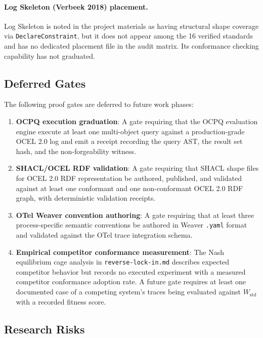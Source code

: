 \paragraph{Log Skeleton (Verbeek 2018) placement.}
Log Skeleton is noted in the project materials as having structural shape coverage via
\texttt{DeclareConstraint}, but it does not appear among the 16 verified standards and has
no dedicated placement file in the audit matrix. Its conformance checking capability has
not graduated.

\subsection{Deferred Gates}
\label{sec:standards-open-deferred}

The following proof gates are deferred to future work phases:

\begin{enumerate}
  \item \textbf{OCPQ execution graduation}: A gate requiring that the OCPQ evaluation
        engine execute at least one multi-object query against a production-grade OCEL 2.0
        log and emit a receipt recording the query AST, the result set hash, and the
        non-forgeability witness.
  \item \textbf{SHACL/OCEL RDF validation}: A gate requiring that SHACL shape files for
        OCEL 2.0 RDF representation be authored, published, and validated against at least
        one conformant and one non-conformant OCEL 2.0 RDF graph, with deterministic
        validation receipts.
  \item \textbf{OTel Weaver convention authoring}: A gate requiring that at least three
        process-specific semantic conventions be authored in Weaver \texttt{.yaml} format
        and validated against the OTel trace integration schema.
  \item \textbf{Empirical competitor conformance measurement}: The Nash equilibrium cage
        analysis in \texttt{reverse-lock-in.md} describes expected competitor behavior but
        records no executed experiment with a measured competitor conformance adoption rate.
        A future gate requires at least one documented case of a competing system's traces
        being evaluated against $W_{\text{std}}$ with a recorded fitness score.
\end{enumerate}

\subsection{Research Risks}
\label{sec:standards-open-risks}

